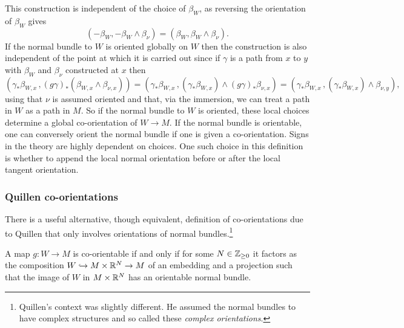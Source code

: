 This construction is independent of the choice of $\beta_W$, as reversing the orientation of $\beta_W$ gives
$$(-\beta_W, -\beta_W \wedge \beta_\nu) = (\beta_W, \beta_W \wedge \beta_\nu).$$
If the normal bundle to $W$ is oriented globally on $W$ then the construction is also independent of the point at which it is carried out since if $\gamma$ is a path from $x$ to $y$ with $\beta_W$ and $\beta_\nu$ constructed at $x$ then
\begin{equation*}
	(\gamma_*\beta_{W,x}\, , (g\gamma)_* (\beta_{W,x} \wedge \beta_{\nu,x})) =
	(\gamma_*\beta_{W,x}\, , (\gamma_* \beta_{W,x}) \wedge (g\gamma)_*\beta_{\nu,x}) =
	(\gamma_*\beta_{W,x}\, , (\gamma_* \beta_{W,x}) \wedge \beta_{\nu,y}),
\end{equation*}
using that $\nu$ is assumed oriented and that, via the immersion, we can treat a path in $W$ as a path in $M$.
So if the normal bundle to $W$ is oriented, these local choices determine a global co-orientation of $W \to M$.
If the normal bundle is orientable, one can conversely orient the normal bundle if one is given a co-orientation.
Signs in the theory are highly dependent on choices.
One such choice in this definition is whether to append the local normal orientation before or after the local tangent orientation.

\subsubsection{Quillen co-orientations}\label{S: Quillen}

There is a useful alternative, though equivalent, definition of co-orientations due to Quillen \cite{Quil71} that only involves orientations of normal bundles.\footnote{Quillen's context was slightly different.
He assumed the normal bundles to have complex structures and so called these \textit{complex orientations}.}

\begin{lemma}\label{L: Quillen}
	A map $g \colon W \to M$ is co-orientable if and only if for some $N \in \mathbb{Z}_{\geq 0}$ it factors as the composition $W \hookrightarrow M \times \mathbb{R}^N \to M$ of an embedding and a projection such that the image of $W$ in $M \times \mathbb{R}^N$ has an orientable normal bundle.
\end{lemma}

